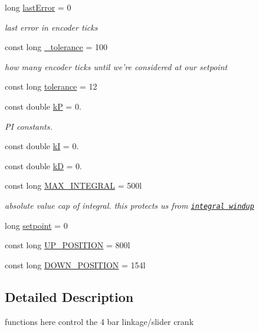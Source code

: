 \begin{DoxyCompactItemize}
long \hyperlink{classArm_a5061b95381cc72d417f5a5275b871e47}{last\-Error} = 0
\begin{DoxyCompactList}\small\item\em last error in encoder ticks \end{DoxyCompactList}\item 
const long \hyperlink{classArm_af2251ac7ebd3c88f660e7a6dcc62ffd0}{\-\_\-tolerance} = 100
\begin{DoxyCompactList}\small\item\em how many encoder ticks until we're considered at our setpoint \end{DoxyCompactList}\item 
const long \hyperlink{classArm_afb4e56fd59b92d0b4c157c0ea7fe9db8}{tolerance} = 12
\item 
const double \hyperlink{classArm_ac6d95b0c5f8a7700b3d25a9fcead2291}{k\-P} = 0.
\begin{DoxyCompactList}\small\item\em P\-I constants. \end{DoxyCompactList}\item 
const double \hyperlink{classArm_a15dca8014bd3994a0d9b62efc0bcb983}{k\-I} = 0.
\item 
const double \hyperlink{classArm_aba816c407060b76429a785f6b15a6980}{k\-D} = 0.
\item 
const long \hyperlink{classArm_a05988f2c31e40dd3894c1343bf73a7b8}{M\-A\-X\-\_\-\-I\-N\-T\-E\-G\-R\-A\-L} = 500l
\begin{DoxyCompactList}\small\item\em absolute value cap of integral. this protects us from \href{https://en.wikipedia.org/wiki/Integral_windup}{\tt integral windup} \end{DoxyCompactList}\item 
long \hyperlink{classArm_aa168ca685ff8170699ca535590c2af14}{setpoint} = 0
\item 
const long \hyperlink{classArm_a44fed3661f22f9acd7f3cd8635a4fc6a}{U\-P\-\_\-\-P\-O\-S\-I\-T\-I\-O\-N} = 800l
\item 
const long \hyperlink{classArm_a3a95b43d43f1e4858829ff474555f81f}{D\-O\-W\-N\-\_\-\-P\-O\-S\-I\-T\-I\-O\-N} = 154l
\end{DoxyCompactItemize}


\subsection{Detailed Description}
functions here control the 4 bar linkage/slider crank 

